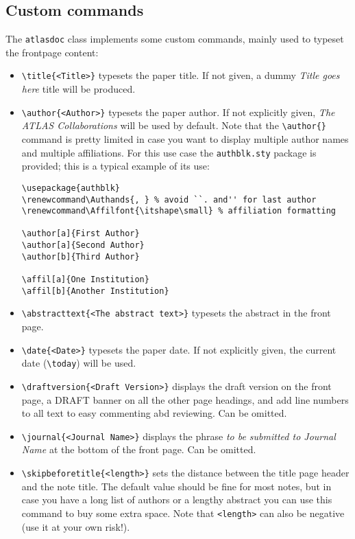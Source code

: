 \documentclass{style/atlasdoc}
\begin{document}
\subsection{Custom commands}

The \texttt{atlasdoc} class implements some custom commands, mainly
used to typeset the frontpage content:

\begin{itemize}

  \item {\verb|\title{<Title>}|} typesets the paper title. If not
    given, a dummy \emph{Title goes here} title will be produced.

  \item {\verb|\author{<Author>}|} typesets the paper author. If not
    explicitly given, \emph{The ATLAS Collaborations} will be used by
    default. Note that the \verb|\author{}| command is pretty limited
    in case you want to display multiple author names and multiple
    affiliations. For this use case the \verb|authblk.sty| package is
    provided; this is a typical example of its use:
    \begin{verbatim}
\usepackage{authblk}
\renewcommand\Authands{, } % avoid ``. and'' for last author
\renewcommand\Affilfont{\itshape\small} % affiliation formatting

\author[a]{First Author}
\author[a]{Second Author}
\author[b]{Third Author}

\affil[a]{One Institution}
\affil[b]{Another Institution}
    \end{verbatim}

  \item {\verb|\abstracttext{<The abstract text>}|} typesets the
    abstract in the front page.

  \item {\verb|\date{<Date>}|} typesets the paper date. If not
    explicitly given, the current date (\verb|\today|) will be used.

  \item {\verb|\draftversion{<Draft Version>}|} displays the draft
    version on the front page, a DRAFT banner on all the other page
    headings, and add line numbers to all text to easy commenting abd
    reviewing. Can be omitted.

  \item {\verb|\journal{<Journal Name>}|} displays the phrase \emph{to
    be submitted to Journal Name} at the bottom of the front page. Can
    be omitted.

  \item {\verb|\skipbeforetitle{<length>}|} sets the distance between
    the title page header and the note title. The default value should
    be fine for most notes, but in case you have a long list of
    authors or a lengthy abstract you can use this command to buy
    some extra space. Note that \verb|<length>| can also be negative
    (use it at your own risk!).

\end{itemize}
\end{document}
